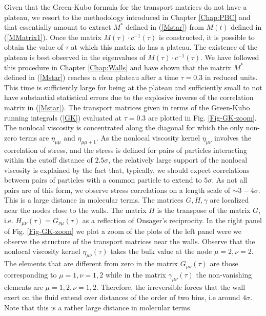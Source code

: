 \documentclass[b5paper,openright,10pt]{book}
\newcommand{\esc}{\!\cdot\!}
\begin{document}
Given that the  Green-Kubo formula for the transport  matrices do not
have  a   plateau,  we  resort   to  the  methodology   introduced  in
Chapter \ref{Chap:PBC} and that essentially amount to extract $M^*$ defined in
(\ref{Mstar}) from $M(t)$ defined in (\ref{MMatrix1}). Once the matrix
$M(\tau)\esc c^{-1}(\tau)$  is constructed,  it is possible  to obtain
the  value of  $\tau$  at which  this  matrix do  has  a plateau.  The
existence  of the  plateau  is  best observed  in  the eigenvalues  of
$M(\tau)\esc  c^{-1}(\tau)$.   We  have  followed  this  procedure  in
Chapter \ref{Chap:Walls}
and have shown that the  matrix $M^*$ defined in (\ref{Mstar}) reaches
a clear plateau  after a time $\tau=0.3$ in reduced  units.  This time
is sufficiently large for being  at the plateau and sufficiently small
to  not  have substantial  statistical  errors  due to  the  explosive
inverse  of the  correlation  matrix in  (\ref{Mstar}). The  transport
matrices given in terms of the Green-Kubo running integrals (\ref{GK})
evaluated  at  $\tau=0.3$  are  plotted in  Fig.   \ref{Fig-GK-zoom}.   The
nonlocal viscosity is  concentrated along the diagonal  for which the
only non-zero terms are  $\eta_{\mu\mu}$ and $\eta_{\mu\mu+1}$. As the
nonlocal viscosity kernel $\eta_{\mu\nu}$ involves the correlation of
stress, and the  stress is defined for pairs  of particles interacting
within  the  cutoff  distance  of $2.5\sigma$,  the  relatively  large
support of the nonlocal viscosity is  explained by  the fact that,  typically, we  should expect
correlations  between pairs  of particles  with a  common particle  to
extend to  $5\sigma$. As not  all pairs are  of this form,  we observe
stress correlations on  a length scale of $\sim 3-4\sigma$.  This is a
large  distance in  molecular  terms.  The  matrices $G,H,\gamma$  are
localized near  the nodes close to  the walls.  The matrix  $H$ is the
transpose of the matrix $G$, i.e.  $H_{\mu\nu}(\tau)=G_{\nu\mu}(\tau)$
as a reflection of  Onsager's reciprocity.  In the right panel of Fig.  \ref{Fig-GK-zoom}
we plot  a zoom of the plots of the left panel were we observe  the structure of
the transport  matrices near  the walls.   Observe that  the nonlocal
viscosity  kernel $\eta_{\mu\nu}(\tau)$  takes the  bulk value  at the
node $\mu=2,\nu=2$. The  elements that are different from  zero in the
matrix $G_{\mu\nu}(\tau)$  are those corresponding  to $\mu=1,\nu=1,2$
while in the matrix $\gamma_{\mu\nu}(\tau)$ the non-vanishing elements
are $\mu=1,2,  \nu=1,2$.  Therefore, the irreversible  forces that the
wall exert  on the  fluid extend  over distances of  the order  of two
bins, i.e around $4\sigma$.  Note that this is a rather large distance
in molecular terms.
\end{document}

